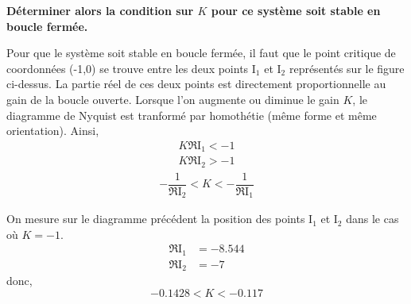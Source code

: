 \question{}
\textbf{Déterminer alors la condition sur $K$ pour ce système soit stable en boucle fermée.}
\begin{center}
\end{center}

Pour que le système soit stable en boucle fermée, il faut que le point 
critique de coordonnées (-1,0) se trouve entre les deux points I$_1$ et I$_2$ représentés sur
le figure ci-dessus.
La partie réel de ces deux points est directement proportionnelle au 
gain de la boucle ouverte. Lorsque l'on augmente ou diminue le gain $K$, le diagramme 
de Nyquist est tranformé par homothétie (même forme et même orientation).
Ainsi, 
\begin{align*}
K\Re{\mathrm{I}_1} < -1 \\
K\Re{\mathrm{I}_2} > -1 
\end{align*}
\begin{align*}
-\dfrac{1}{\Re{\mathrm{I}_2}}<K<-\dfrac{1}{\Re{\mathrm{I}_1}}
\end{align*}

On mesure sur le diagramme précédent la position des points I$_1$ et I$_2$ dans le cas où $K=-1$.
\begin{align*}
    \Re{\mathrm{I}_1}&=-8.544\\
    \Re{\mathrm{I}_2}&=-7
\end{align*}
donc,
$$
-0.1428<K<-0.117
$$

